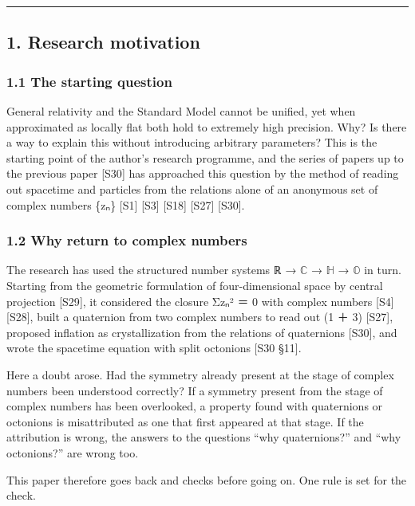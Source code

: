 \documentclass[
  a4paper,
]{article}
\begin{document}
\begin{center}\rule{0.5\linewidth}{0.5pt}\end{center}

\subsection{1. Research motivation}\label{research-motivation}

\subsubsection{1.1 The starting question}\label{the-starting-question}

General relativity and the Standard Model cannot be unified, yet when
approximated as locally flat both hold to extremely high precision. Why?
Is there a way to explain this without introducing arbitrary parameters?
This is the starting point of the author's research programme, and the
series of papers up to the previous paper {[}S30{]} has approached this
question by the method of reading out spacetime and particles from the
relations alone of an anonymous set of complex numbers \{zₙ\} {[}S1{]}
{[}S3{]} {[}S18{]} {[}S27{]} {[}S30{]}.

\subsubsection{1.2 Why return to complex
numbers}\label{why-return-to-complex-numbers}

The research has used the structured number systems ℝ → \(\mathbb{C}\) →
\(\mathbb{H}\) → \(\mathbb{O}\) in turn. Starting from the geometric
formulation of four-dimensional space by central projection {[}S29{]},
it considered the closure Σzₙ² ＝ 0 with complex numbers {[}S4{]}
{[}S28{]}, built a quaternion from two complex numbers to read out (1 ＋
3) {[}S27{]}, proposed inflation as crystallization from the relations
of quaternions {[}S30{]}, and wrote the spacetime equation with split
octonions {[}S30 §11{]}.

Here a doubt arose. Had the symmetry already present at the stage of
complex numbers been understood correctly? If a symmetry present from
the stage of complex numbers has been overlooked, a property found with
quaternions or octonions is misattributed as one that first appeared at
that stage. If the attribution is wrong, the answers to the questions
``why quaternions?'' and ``why octonions?'' are wrong too.

This paper therefore goes back and checks before going on. One rule is
set for the check.
\end{document}
